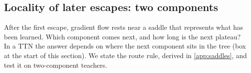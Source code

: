 \subsection{Locality of later escapes: two components}\label{sec:s2s-locality}

After the first escape, gradient flow rests near a saddle that represents what has been learned. Which
component comes next, and how long is the next plateau? In a TTN the answer depends on where the next component
sits in the tree (box at the start of this section). We state the route rule, derived in \cref{app:saddles},
and test it on two-component teachers.

